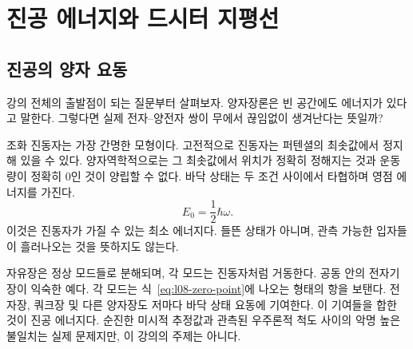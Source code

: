\chapter{진공 에너지와 드시터 지평선}


\section{진공의 양자 요동}

강의 전체의 출발점이 되는 질문부터 살펴보자. 양자장론은 빈 공간에도 에너지가 있다고 말한다. 그렇다면 실제 전자--양전자 쌍이 무에서 끊임없이 생겨난다는 뜻일까?

\begin{classroomqa}
\end{classroomqa}

조화 진동자는 가장 간명한 모형이다. 고전적으로 진동자는 퍼텐셜의 최솟값에서 정지해 있을 수 있다. 양자역학적으로는 그 최솟값에서 위치가 정확히 정해지는 것과 운동량이 정확히 0인 것이 양립할 수 없다. 바닥 상태는 두 조건 사이에서 타협하며 영점 에너지를 가진다.
\begin{equation}
E_0=\frac{1}{2}\hbar\omega.
\label{eq:l08-zero-point}
\end{equation}
이것은 진동자가 가질 수 있는 최소 에너지다. 들뜬 상태가 아니며, 관측 가능한 입자들이 흘러나오는 것을 뜻하지도 않는다.

자유장은 정상 모드들로 분해되며, 각 모드는 진동자처럼 거동한다. 공동 안의 전자기장이 익숙한 예다. 각 모드는 식~\eqref{eq:l08-zero-point}에 나오는 형태의 항을 보탠다. 전자장, 쿼크장 및 다른 양자장도 저마다 바닥 상태 요동에 기여한다. 이 기여들을 합한 것이 진공 에너지다. 순진한 미시적 추정값과 관측된 우주론적 척도 사이의 악명 높은 불일치는 실제 문제지만, 이 강의의 주제는 아니다.

